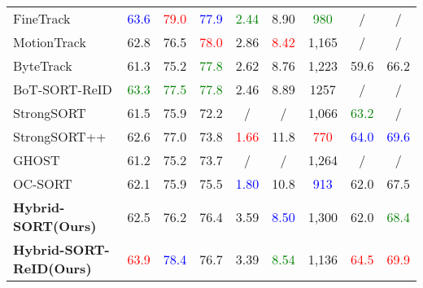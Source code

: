 \documentclass[letterpaper]{article} \usepackage{aaai23}  \usepackage{times}  \usepackage{helvet}  \usepackage{courier}  \usepackage[hyphens]{url}  \usepackage{graphicx} \urlstyle{rm} \def\UrlFont{\rm}  \usepackage{natbib}  \usepackage{caption} \frenchspacing  \setlength{\pdfpagewidth}{8.5in}  \setlength{\pdfpageheight}{11in}  \usepackage{algorithm}
\begin{document}
\begin{table*}
\begin{center}
{\begin{tabular}{l|cccccccc}
FineTrack \textcolor{blue}{\cite{ren2023focus}} & \textcolor{blue}{63.6} & \textcolor{red}{79.0} & \textcolor{blue}{77.9} & \textcolor{green}{2.44} & 8.90 & \textcolor{green}{980} & / & / \\
MotionTrack \textcolor{blue}{\cite{qin2023motiontrack}} & 62.8 & 76.5 & \textcolor{red}{78.0} & 2.86 & \textcolor{red}{8.42} & 1,165 & / & / \\
\rowcolor{blue!10} ByteTrack \textcolor{blue}{\cite{zhang2022bytetrack}}  & 61.3 & 75.2 & \textcolor{green}{77.8} & 2.62 & 8.76 & 1,223 & 59.6 & 66.2 \\
\rowcolor{blue!10} BoT-SORT-ReID \textcolor{blue}{\cite{aharon2022bot}}  & \textcolor{green}{63.3} &   \textcolor{green}{77.5} & \textcolor{green}{77.8} & 2.46 & 8.89 & 1257 & / & / \\
\rowcolor{blue!10} StrongSORT \textcolor{blue}{\cite{du2023strongsort}}  & 61.5 & 75.9 & 72.2 & / & / & 1,066 & \textcolor{green}{63.2} & / \\
\rowcolor{blue!10} StrongSORT++ \textcolor{blue}{\cite{du2023strongsort}}  & 62.6 &77.0 & 73.8 & \textcolor{red}{1.66} & 11.8 & \textcolor{red}{770} & \textcolor{blue}{64.0} & \textcolor{blue}{69.6} \\
\rowcolor{blue!10} GHOST \textcolor{blue}{\cite{seidenschwarz2023simple}}  & 61.2 & 75.2 & 73.7 & / & / & 1,264 & / & / \\
\rowcolor{blue!10} OC-SORT \textcolor{blue}{\cite{cao2023observation}}  & 62.1 & 75.9 & 75.5 & \textcolor{blue}{1.80} & 10.8 & \textcolor{blue}{913} & 62.0 & 67.5 \\
\rowcolor{blue!10} \textbf{Hybrid-SORT(Ours)}  & 62.5 & 76.2 & 76.4 & 3.59 & \textcolor{blue}{8.50} & 1,300 & 62.0 & \textcolor{green}{68.4} \\
\rowcolor{blue!10} \textbf{Hybrid-SORT-ReID(Ours)}  & \textcolor{red}{63.9} & \textcolor{blue}{78.4} & 76.7 & 3.39 & \textcolor{green}{8.54} & 1,136 & \textcolor{red}{64.5} & \textcolor{red}{69.9} \\
\hline
\end{tabular}
}
\end{center}
\end{table*}
\end{document}
